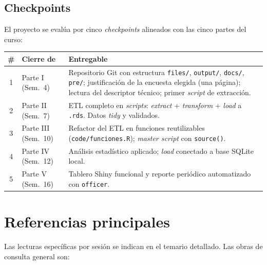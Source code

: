 \documentclass[11pt,letterpaper]{article}
\begin{document}
\subsection*{Checkpoints}

El proyecto se evalúa por cinco \textit{checkpoints} alineados con las cinco partes del curso:

\begin{center}
\begin{tabular}{cp{2.6cm}p{9cm}}
\toprule
\textbf{\#} & \textbf{Cierre de} & \textbf{Entregable} \\
\midrule
1 & Parte I (Sem.\ 4)   & Repositorio Git con estructura \texttt{files/}, \texttt{output/}, \texttt{docs/}, \texttt{pre/}; justificación de la encuesta elegida (una página); lectura del descriptor técnico; primer \textit{script} de extracción. \\
2 & Parte II (Sem.\ 7)  & ETL completo en \textit{scripts}: \textit{extract} + \textit{transform} + \textit{load} a \texttt{.rds}. Datos \textit{tidy} y validados. \\
3 & Parte III (Sem.\ 10) & Refactor del ETL en funciones reutilizables (\texttt{code/funciones.R}); \textit{master script} con \texttt{source()}. \\
4 & Parte IV (Sem.\ 12) & Análisis estadístico aplicado; \textit{load} conectado a base SQLite local. \\
5 & Parte V (Sem.\ 16) & Tablero Shiny funcional y reporte periódico automatizado con \texttt{officer}. \\
\bottomrule
\end{tabular}
\end{center}

\section{Referencias principales}

Las lecturas específicas por sesión se indican en el temario detallado. Las obras de consulta general son:

\nocite{wickham2023r4ds, wickham2019advr, wickham2016ggplot2, wickham2021mastering-shiny, rcoreteam-intro, bryan-happygit, ushey-renv, silge-tidytext, croissant-plm, robinson-broom, arelbundock-modelsummary, gohel-officer, gohel-flextable, bryan-googledrive, hester-gmailr, bslib-docs, kunst-highcharter, sievert-plotly, wickham-ellmer, wickham-httr2}

\printbibliography[heading=none]
\end{document}
